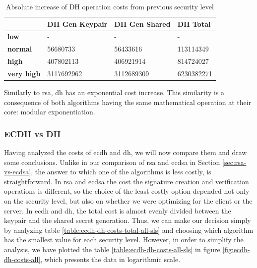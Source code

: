 \documentclass{llncs}
\begin{document}
  \begin{table}[]
    \begin{tabular}{|l|l|l|l|}
    \hline
                       & \textbf{DH Gen Keypair} & \textbf{DH Gen Shared} & \textbf{DH Total} \\ \hline
    \textbf{low}       & -                       & -                      & -                 \\ \hline
    \textbf{normal}    & 56680733                & 56433616               & 113114349         \\ \hline
    \textbf{high}      & 407802113               & 406921914              & 814724027         \\ \hline
    \textbf{very high} & 3117692962              & 3112689309             & 6230382271        \\ \hline
    \end{tabular}
    \centering \caption{\label{table:dh-absolute-cost-increase} Absolute increase of DH operation costs from previous security level}
    \end{table}

Similarly to \gls{rsa}, \gls{dh} has an exponential cost increase. This similarity is a consequence of both algorithms having the same mathematical
operation at their core: modular exponentiation.

\subsubsection{ECDH vs DH}

Having analyzed the costs of \gls{ecdh} and \gls{dh}, we will now compare them and draw some conclusions. Unlike in our comparison of
\gls{rsa} and \gls{ecdsa} in Section \ref{sec:rsa-vs-ecdsa}, the answer to which one of the algorithms is less costly, is straightforward.
In \gls{rsa} and \gls{ecdsa} the cost the signature creation and verification operations is different, so the choice of the least costly
option depended not only on the security level, but also on whether we were optimizing for the client or the server. In \gls{ecdh} and \gls{dh},
the total cost is almost evenly divided between the keypair and the shared secret generation. Thus, we can make our decision simply
by analyzing table \ref{table:ecdh-dh-costs-total-all-sls} and choosing which algorithm has the smallest value for each security level.
However, in order to simplify the analysis, we have plotted the table \ref{table:ecdh-dh-costs-all-sls} in figure \ref{fig:ecdh-dh-costs-all}, which
presents the data in logarithmic scale.
\end{document}
